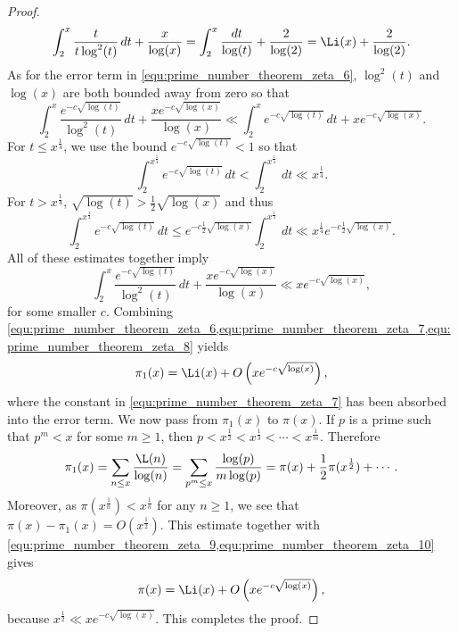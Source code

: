 \begin{proof}
\begin{equation}
        \int_{2}^{x}\frac{t}{t\log^{2}(t)}\,dt+\frac{x}{\log(x)} = \int_{2}^{x}\frac{dt}{\log(t)}+\frac{2}{\log(2)} = \Li(x)+\frac{2}{\log(2)}.
      \end{equation}
      As for the error term in \cref{equ:prime_number_theorem_zeta_6}, $\log^{2}(t)$ and $\log(x)$ are both bounded away from zero so that
      \[
        \int_{2}^{x}\frac{e^{-c\sqrt{\log(t)}}}{\log^{2}(t)}\,dt+\frac{xe^{-c\sqrt{\log(x)}}}{\log(x)} \ll \int_{2}^{x}e^{-c\sqrt{\log(t)}}\,dt+xe^{-c\sqrt{\log(x)}}.
      \]
      For $t \le x^{\frac{1}{4}}$, we use the bound $e^{-c\sqrt{\log(t)}} < 1$ so that
      \[
        \int_{2}^{x^{\frac{1}{4}}}e^{-c\sqrt{\log(t)}}\,dt < \int_{2}^{x^{\frac{1}{4}}}\,dt \ll x^{\frac{1}{4}}.
      \]
      For $t > x^{\frac{1}{4}}$, $\sqrt{\log(t)} > \frac{1}{2}\sqrt{\log(x)}$ and thus
      \[
        \int_{2}^{x^{\frac{1}{4}}}e^{-c\sqrt{\log(t)}}\,dt \le e^{-c\frac{1}{2}\sqrt{\log(x)}}\int_{2}^{x^{\frac{1}{4}}}\,dt \ll x^{\frac{1}{4}}e^{-c\frac{1}{2}\sqrt{\log(x)}}. 
      \]
      All of these estimates together imply
      \begin{equation}\label{equ:prime_number_theorem_zeta_8}
        \int_{2}^{x}\frac{e^{-c\sqrt{\log(t)}}}{\log^{2}(t)}\,dt+\frac{xe^{-c\sqrt{\log(x)}}}{\log(x)} \ll xe^{-c\sqrt{\log(x)}},
      \end{equation}
      for some smaller $c$. Combining \cref{equ:prime_number_theorem_zeta_6,equ:prime_number_theorem_zeta_7,equ:prime_number_theorem_zeta_8} yields
      \begin{equation}\label{equ:prime_number_theorem_zeta_9}
        \pi_{1}(x) = \Li(x)+O\left(xe^{-c\sqrt{\log(x)}}\right),
      \end{equation}
      where the constant in \cref{equ:prime_number_theorem_zeta_7} has been absorbed into the error term. We now pass from $\pi_{1}(x)$ to $\pi(x)$. If $p$ is a prime such that $p^{m} < x$ for some $m \ge 1$, then $p < x^{\frac{1}{2}} < x^{\frac{1}{3}} < \cdots < x^{\frac{1}{m}}$. Therefore
      \begin{equation}\label{equ:prime_number_theorem_zeta_10}
        \pi_{1}(x) = \sum_{n \le x}\frac{\L(n)}{\log(n)} = \sum_{p^{m} \le x}\frac{\log(p)}{m\log(p)} = \pi(x)+\frac{1}{2}\pi(x^{\frac{1}{2}})+\cdots.
      \end{equation}
      Moreover, as $\pi(x^{\frac{1}{n}}) < x^{\frac{1}{n}}$ for any $n \ge 1$, we see that $\pi(x)-\pi_{1}(x) = O(x^{\frac{1}{2}})$. This estimate together with \cref{equ:prime_number_theorem_zeta_9,equ:prime_number_theorem_zeta_10} gives
      \[
        \pi(x) = \Li(x)+O\left(xe^{-c\sqrt{\log(x)}}\right),
      \]
      because $x^{\frac{1}{2}} \ll xe^{-c\sqrt{\log(x)}}$. This completes the proof.
    \end{proof}

